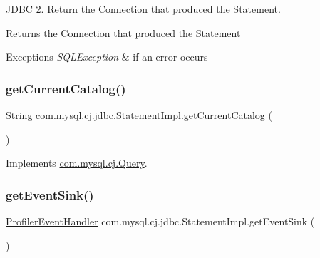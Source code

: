 J\+D\+BC 2. Return the Connection that produced the Statement.

\begin{DoxyReturn}{Returns}
the Connection that produced the Statement
\end{DoxyReturn}

\begin{DoxyExceptions}{Exceptions}
{\em S\+Q\+L\+Exception} & if an error occurs \\
\hline
\end{DoxyExceptions}
\mbox{\label{classcom_1_1mysql_1_1cj_1_1jdbc_1_1_statement_impl_af2b2cc49667c4ca719920667ed148629}} 
\subsubsection{\texorpdfstring{get\+Current\+Catalog()}{getCurrentCatalog()}}
{\footnotesize\ttfamily String com.\+mysql.\+cj.\+jdbc.\+Statement\+Impl.\+get\+Current\+Catalog (\begin{DoxyParamCaption}{ }\end{DoxyParamCaption})}



Implements \mbox{\hyperlink{interfacecom_1_1mysql_1_1cj_1_1_query_a5e5e4f493fd7d0ea5e0ac6d2066af251}{com.\+mysql.\+cj.\+Query}}.

\mbox{\label{classcom_1_1mysql_1_1cj_1_1jdbc_1_1_statement_impl_a718d61ccf9261f402e7d28a295aca55c}} 
\subsubsection{\texorpdfstring{get\+Event\+Sink()}{getEventSink()}}
{\footnotesize\ttfamily \mbox{\hyperlink{interfacecom_1_1mysql_1_1cj_1_1log_1_1_profiler_event_handler}{Profiler\+Event\+Handler}} com.\+mysql.\+cj.\+jdbc.\+Statement\+Impl.\+get\+Event\+Sink (\begin{DoxyParamCaption}{ }\end{DoxyParamCaption})}



